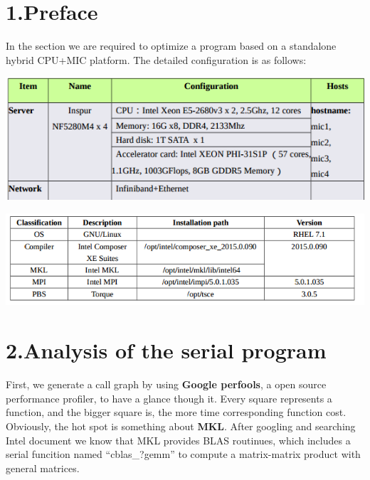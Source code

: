 \documentclass{article}
\begin{document}
\mdxtitleblockstart{}
\mdxauthorstart{}
\mdxauthorend\mdtitleauthorrunning{}{}\mdxtitleblockend%

\section{1.\hspace*{0.5em}Preface}\label{sec-preface}%

\noindent{}In the section we are required to optimize a 
program based on a standalone hybrid CPU+MIC platform. The detailed
configuration is as follows:%

\includegraphics[keepaspectratio=true,width=\dimmin{}{\dimwidth{0.90}}]{images/2016-02-18-23-01-13-}{}%

\noindent{}\includegraphics[keepaspectratio=true,width=\dimmin{}{\dimwidth{0.90}}]{images/2016-02-18-23-13-11-}{}%

\section{2.\hspace*{0.5em}Analysis of the serial program}\label{sec-analysis-of-the-serial-program}%

\noindent{}First, we generate a call graph by using \textbf{Google perfools},
 a open source performance profiler, to have a glance though it. Every
 square represents a function, and the bigger square is, the more time
 corresponding function cost.
Obviously, the hot spot is something about \textbf{MKL}. After googling
and searching Intel document we know that MKL provides BLAS routinues,
which includes a serial funcition named \textquotedblleft{}cblas\_?gemm\textquotedblright{}
to compute a matrix-matrix product with general matrices.%
\end{document}
